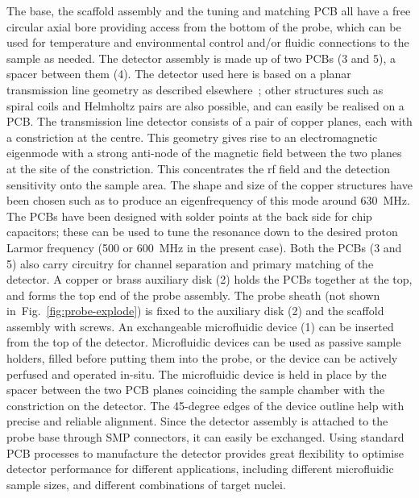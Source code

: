 \documentclass[preprint,5p]{elsarticle}
\newcommand{\fig}[1]{Fig.~\ref{#1}}
\begin{document}
The base, the scaffold assembly and the tuning and matching PCB all have a free circular 
axial bore providing access from the bottom of the probe, which can be used for 
temperature and environmental control and/or fluidic connections to the sample as
needed.
The detector assembly is made up of two PCBs (3 and 5), a spacer between them (4). The detector used here is based on a planar transmission line geometry 
as described elsewhere~\cite{gream_2016,stripline_jan}; other structures such as spiral
coils and Helmholtz pairs are also possible, and can easily be realised on a PCB.
The transmission line detector consists of a pair of copper 
planes, each with a constriction at the centre.  This geometry gives rise to an 
electromagnetic eigenmode with a strong anti-node of the magnetic field between
the two planes at the site of the constriction. This concentrates the rf field 
and the detection sensitivity
onto the sample area. 
The shape and size of the copper structures have been chosen such as to produce
an eigenfrequency of this mode around 630~MHz. The PCBs have been designed with
solder points at the back side for chip capacitors; these can be used to tune the
resonance down to the desired proton Larmor frequency (500 or 600~MHz in the present case).
Both the PCBs (3 and 5) also carry circuitry for channel separation and primary 
matching of the detector. A copper or brass auxiliary disk (2) holds the PCBs 
together at the top, and forms the top end of the probe assembly.
The probe sheath (not shown in~\fig{fig:probe-explode}) is fixed to the auxiliary disk (2) 
and the scaffold assembly with screws. 
An exchangeable microfluidic device (1) can be inserted from the top of the detector. 
Microfluidic devices can be used as passive sample holders, filled before putting them
into the probe,
or the device can be actively perfused and operated in-situ. 
The microfluidic device is held in place by the spacer 
between the two PCB planes coinciding the sample chamber with the constriction on the 
detector.  The 45-degree edges of the device outline help with precise and reliable
alignment. 
Since the detector assembly is attached to the probe base through SMP 
connectors, it can easily be exchanged. 
Using standard PCB processes to manufacture the detector provides great flexibility
to optimise detector performance for different applications, including different
microfluidic sample sizes, and different combinations of target nuclei.
\end{document}
